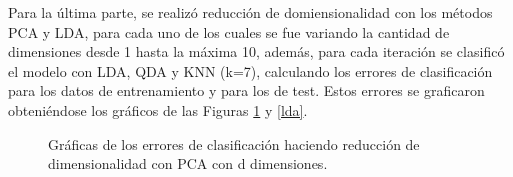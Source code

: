 \documentclass[letter, 10pt]{article}
\begin{document}
Para la última parte, se realizó reducción de domiensionalidad con los métodos PCA y LDA, para cada uno de los cuales se fue variando la cantidad de dimensiones desde 1 hasta la máxima 10, además, para cada iteración se clasificó el modelo con LDA, QDA y KNN (k=7), calculando los errores de clasificación para los datos de entrenamiento y para los de test. Estos errores se graficaron obteniéndose los gráficos de las Figuras \ref{pca} y \ref{lda}.\\

\begin{figure}[h]
\begin{center}
\caption{Gráficas de los errores de clasificación haciendo reducción de dimensionalidad con PCA con d dimensiones.} 
\label{pca}
\end{center}
\end{figure}
\end{document}
